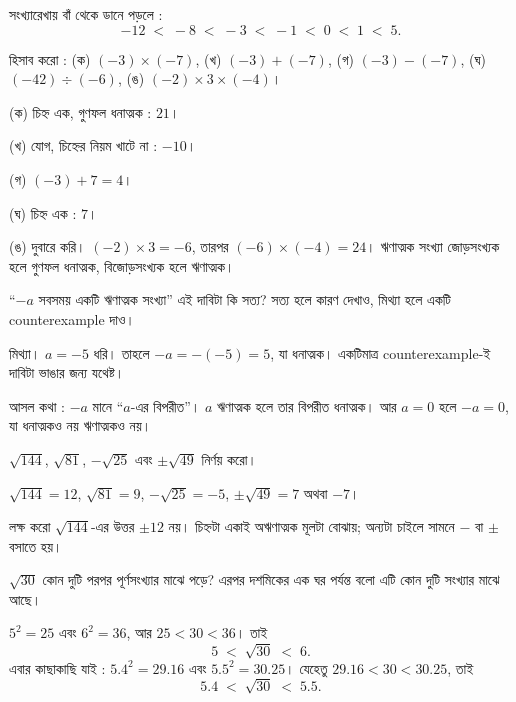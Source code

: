 \documentclass[11pt]{article}
\begin{document}
\begin{sol}
সংখ্যারেখায় বাঁ থেকে ডানে পড়লে :
\[
  -12 \;<\; -8 \;<\; -3 \;<\; -1 \;<\; 0 \;<\; 1 \;<\; 5 .
\]
\end{sol}

 হিসাব করো :
(ক) $(-3) \times (-7)$, \;
(খ) $(-3) + (-7)$, \;
(গ) $(-3) - (-7)$, \;
(ঘ) $(-42) \div (-6)$, \;
(ঙ) $(-2) \times 3 \times (-4)$।

\begin{sol}
(ক) চিহ্ন এক, গুণফল ধনাত্মক : $21$।

(খ) যোগ, চিহ্নের নিয়ম খাটে না : $-10$।

(গ) $(-3) + 7 = 4$।

(ঘ) চিহ্ন এক : $7$।

(ঙ) দুবারে করি। $(-2) \times 3 = -6$, তারপর $(-6) \times (-4) = 24$।
ঋণাত্মক সংখ্যা জোড়সংখ্যক হলে গুণফল ধনাত্মক, বিজোড়সংখ্যক হলে ঋণাত্মক।
\end{sol}

 ``$-a$ সবসময় একটি ঋণাত্মক সংখ্যা'' \; এই দাবিটা কি সত্য? সত্য হলে
কারণ দেখাও, মিথ্যা হলে একটি counterexample দাও।

\begin{sol}
মিথ্যা। $a = -5$ ধরি। তাহলে $-a = -(-5) = 5$, যা ধনাত্মক। একটিমাত্র
counterexample-ই দাবিটা ভাঙার জন্য যথেষ্ট।

আসল কথা : $-a$ মানে ``$a$-এর বিপরীত''। $a$ ঋণাত্মক হলে তার বিপরীত ধনাত্মক।
আর $a = 0$ হলে $-a = 0$, যা ধনাত্মকও নয় ঋণাত্মকও নয়।
\end{sol}

 $\sqrt{144}$, \; $\sqrt{81}$, \; $-\sqrt{25}$ \; এবং $\pm\sqrt{49}$
নির্ণয় করো।

\begin{sol}
$\sqrt{144} = 12$, \; $\sqrt{81} = 9$, \; $-\sqrt{25} = -5$, \;
$\pm\sqrt{49} = 7$ অথবা $-7$।

লক্ষ করো $\sqrt{144}$-এর উত্তর $\pm 12$ নয়। চিহ্নটা একাই অঋণাত্মক মূলটা বোঝায়;
অন্যটা চাইলে সামনে $-$ বা $\pm$ বসাতে হয়।
\end{sol}

 $\sqrt{30}$ কোন দুটি পরপর পূর্ণসংখ্যার মাঝে পড়ে? এরপর দশমিকের এক ঘর
পর্যন্ত বলো এটি কোন দুটি সংখ্যার মাঝে আছে।

\begin{sol}
$5^2 = 25$ এবং $6^2 = 36$, আর $25 < 30 < 36$। তাই
\[
  5 \;<\; \sqrt{30} \;<\; 6 .
\]
এবার কাছাকাছি যাই : $5.4^2 = 29.16$ এবং $5.5^2 = 30.25$। যেহেতু
$29.16 < 30 < 30.25$, তাই
\[
  5.4 \;<\; \sqrt{30} \;<\; 5.5 .
\]
\end{sol}
\end{document}

